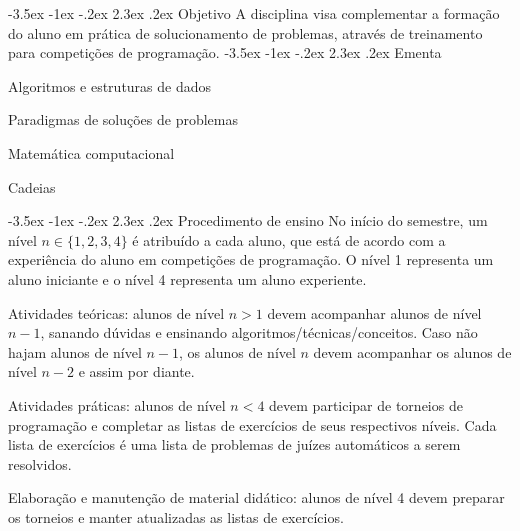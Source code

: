 \documentclass{UnBExam}%
\makeatletter
\renewcommand\section{\@startsection{section}{1}{\z@}%
	{-3.5ex \@plus -1ex \@minus -.2ex}%
	{2.3ex \@plus.2ex}%
	{\normalfont\normalsize\bfseries}}%
\newenvironment{my_itemize}%
{\begin{itemize}%
  \vspace{-0.3\baselineskip}
  \setlength{\itemsep}{1pt}%
  \setlength{\parskip}{0pt}%
  \setlength{\parsep}{0pt}}%
{\end{itemize}}
\makeatother
\begin{document}
	\section{Objetivo}%
		\hspace{.5cm} A disciplina visa complementar a formação do aluno em prática de solucionamento de problemas, através de treinamento para competições de programação.
\vspace{-0.25cm}	
	\section{Ementa}%
	\begin{my_itemize}
		\item Algoritmos e estruturas de dados
		\item Paradigmas de soluções de problemas
		\item Matemática computacional
		\item Cadeias
	\end{my_itemize}
\vspace{-0.5cm}	
	\section{Procedimento de ensino}%
	\label{sec:procedimento}
		\hspace{.5cm} No início do semestre, um nível $n \in \{1,2,3,4\}$ é atribuído a cada aluno, que está de acordo com a experiência do aluno em competições de programação. O nível 1 representa um aluno iniciante e o nível 4 representa um aluno experiente.
		\begin{my_itemize}
			\item Atividades teóricas: alunos de nível $n > 1$ devem acompanhar alunos de nível $n-1$, sanando dúvidas e ensinando algoritmos/técnicas/conceitos. Caso não hajam alunos de nível $n-1$, os alunos de nível $n$ devem acompanhar os alunos de nível $n-2$ e assim por diante.
			\item Atividades práticas: alunos de nível $n < 4$ devem participar de torneios de programação e completar as listas de exercícios de seus respectivos níveis. Cada lista de exercícios é uma lista de problemas de juízes automáticos a serem resolvidos.
			\item Elaboração e manutenção de material didático: alunos de nível 4 devem preparar os torneios e manter atualizadas as listas de exercícios.
		\end{my_itemize}
\vspace{-0.5cm}
\end{document}
